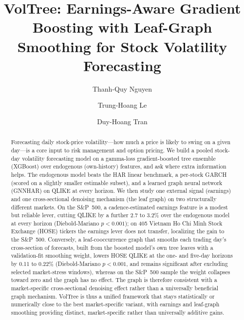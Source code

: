 \documentclass[runningheads,a4paper]{llncs}
\begin{document}
\title{VolTree: Earnings-Aware Gradient Boosting with Leaf-Graph Smoothing for Stock Volatility Forecasting}

\author{Thanh-Quy Nguyen \and Trung-Hoang Le \and Duy-Hoang Tran}

\maketitle
\pagestyle{empty}\thispagestyle{empty}   %

\begin{abstract}
Forecasting daily stock-price volatility---how much a price is likely to swing on a given day---is a core
input to risk management and option pricing. We build a pooled stock-day volatility forecasting model on a
gamma-loss gradient-boosted tree ensemble (XGBoost) over endogenous (own-history) features, and ask where
extra information helps. The endogenous model beats the HAR linear benchmark, a per-stock GARCH (scored on
a slightly smaller estimable subset), and a learned graph neural network (GNNHAR) on QLIKE at every
horizon. We then study one external signal (earnings) and one cross-sectional denoising mechanism (the leaf
graph) on two structurally different markets. On the S\&P~500, a cadence-estimated earnings feature is a
modest but reliable lever,
cutting QLIKE by a further 2.7 to 3.2\% over the endogenous model at every horizon (Diebold-Mariano
$p<0.001$); on 405 Vietnam Ho Chi Minh Stock Exchange (HOSE) tickers the earnings lever does not transfer,
localizing the gain to the S\&P~500. Conversely, a leaf-cooccurrence graph that smooths each trading day's
cross-section of forecasts, built from the boosted model's own tree leaves with a validation-fit smoothing
weight, lowers HOSE QLIKE at the one- and five-day horizons by 0.11 to 0.22\% (Diebold-Mariano $p<0.001$, and
remains significant after excluding selected market-stress windows), whereas on the S\&P~500 sample the
weight collapses toward zero and the graph has no effect. The graph is therefore consistent with a
market-specific cross-sectional denoising effect rather than a universally beneficial graph mechanism.
VolTree is thus a unified framework that stays statistically or numerically close to the best
market-specific variant, with earnings and leaf-graph smoothing providing distinct, market-specific rather
than universally additive gains.
\end{abstract}
\end{document}
